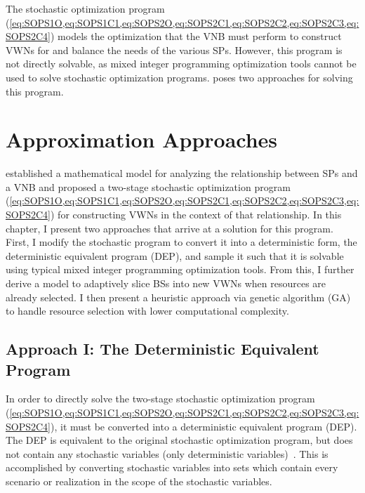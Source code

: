 \documentclass[12pt,dvipsnames]{report}
\newcommand\defeq{\mathrel{\overset{\makebox[0pt]{\mbox{\normalfont\tiny\sffamily def}}}{=}}}
\begin{document}

The stochastic optimization program (\cref{eq:SOPS1O,eq:SOPS1C1,eq:SOPS2O,eq:SOPS2C1,eq:SOPS2C2,eq:SOPS2C3,eq:SOPS2C4}) models the optimization that the VNB must perform to construct VWNs for and balance the needs of the various SPs.  However, this program is not directly solvable, as mixed integer programming optimization tools cannot be used to solve stochastic optimization programs.   poses two approaches for solving this program.

\iftrue
\pagebreak
\chapter{Approximation Approaches} \label{ch:approaches}

 established a mathematical model for analyzing the relationship between SPs and a VNB and proposed a two-stage stochastic optimization program (\cref{eq:SOPS1O,eq:SOPS1C1,eq:SOPS2O,eq:SOPS2C1,eq:SOPS2C2,eq:SOPS2C3,eq:SOPS2C4}) for constructing VWNs in the context of that relationship.  In this chapter, I present two approaches that arrive at a solution for this program.  First, I modify the stochastic program to convert it into a deterministic form, the deterministic equivalent program (DEP), and sample it such that it is solvable using typical mixed integer programming optimization tools.  From this, I further derive a model to adaptively slice BSs into new VWNs when resources are already selected.  I then present a heuristic approach via genetic algorithm (GA) to handle resource selection with lower computational complexity.

\section{Approach I: The Deterministic Equivalent Program} \label{sec:dep}

In order to directly solve the two-stage stochastic optimization program (\cref{eq:SOPS1O,eq:SOPS1C1,eq:SOPS2O,eq:SOPS2C1,eq:SOPS2C2,eq:SOPS2C3,eq:SOPS2C4}), it must be converted into a deterministic equivalent program (DEP).  The DEP is equivalent to the original stochastic optimization program, but does not contain any stochastic variables (only deterministic variables)~\cite{stochprogramming}.  This is accomplished by converting stochastic variables into sets which contain every scenario or realization in the scope of the stochastic variables.
\end{document}
